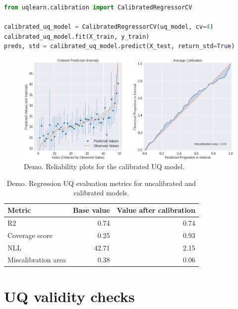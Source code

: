 \begin{lstlisting}[language=Python, caption=Step 2: calibration of UQ model.]
from uqlearn.calibration import CalibratedRegressorCV

calibrated_uq_model = CalibratedRegressorCV(uq_model, cv=4)
calibrated_uq_model.fit(X_train, y_train)
preds, std = calibrated_uq_model.predict(X_test, return_std=True)
\end{lstlisting}


\begin{figure}[h!]
    \centering
    \includegraphics[scale=0.40]{figures/eval/demo/6_calibration_evaluation.png}
    \caption{Demo. Reliability plots for the calibrated UQ model.}
    \label{fig:demo-recalibration}
\end{figure}



\begin{table}[h!]
    \centering
    \begin{tabular}{lrr}
    \toprule
    Metric & Base value & Value after calibration \\
    \midrule
       R2 & 0.74 & 0.74\\
       Coverage score &	0.25 & 0.93 \\
       NLL &	42.71  & 2.15\\
       Miscalibration area & 0.38 & 0.06 \\
    \bottomrule
    \end{tabular}
    \caption{Demo. Regression UQ evaluation metrics for uncalibrated and calibrated models.}
    \label{tab:demo:metrics}
\end{table}

\section{UQ validity checks}

